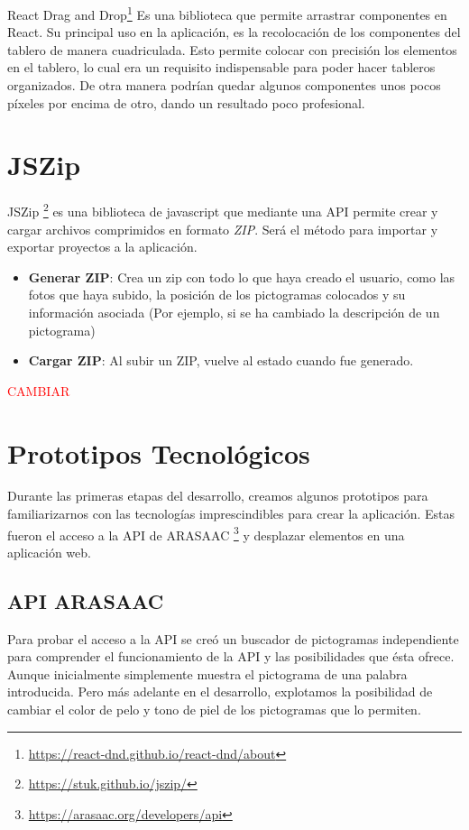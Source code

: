 React Drag and Drop\footnote{\url{https://react-dnd.github.io/react-dnd/about}} Es una biblioteca que permite arrastrar componentes en React. Su principal uso en la aplicación, es la recolocación de los componentes del tablero de manera cuadriculada. Esto permite colocar con precisión los elementos en el tablero, lo cual era un requisito indispensable para poder hacer tableros organizados. De otra manera podrían quedar algunos componentes unos pocos píxeles por encima de otro, dando un resultado poco profesional.

\section{JSZip}

JSZip \footnote{\url{https://stuk.github.io/jszip/}} es una biblioteca de javascript que mediante una API permite crear y cargar archivos comprimidos en formato \textit{ZIP}. Será el método para importar y exportar proyectos a la aplicación.
\begin{itemize}
	\item \textbf{Generar ZIP}: Crea un zip con todo lo que haya creado el usuario, como las fotos que haya subido, la posición de los pictogramas colocados y su información asociada (Por ejemplo, si se ha cambiado la descripción de un pictograma)
	\item \textbf{Cargar ZIP}: Al subir un ZIP, vuelve al estado cuando fue generado.
\end{itemize}	


\textcolor{red}{CAMBIAR}


\section{Prototipos Tecnológicos}

Durante las primeras etapas del desarrollo, creamos algunos prototipos para familiarizarnos con las tecnologías imprescindibles para crear la aplicación. Estas fueron el acceso a la API de ARASAAC \footnote{\url{https://arasaac.org/developers/api}} y desplazar elementos en una aplicación web.

\subsection{API ARASAAC}

Para probar el acceso a la API se creó un buscador de pictogramas independiente para comprender el funcionamiento de la API y las posibilidades que ésta ofrece. Aunque inicialmente simplemente muestra el pictograma de una palabra introducida. Pero más adelante en el desarrollo, explotamos la posibilidad de cambiar el color de pelo y tono de piel de los pictogramas que lo permiten.


